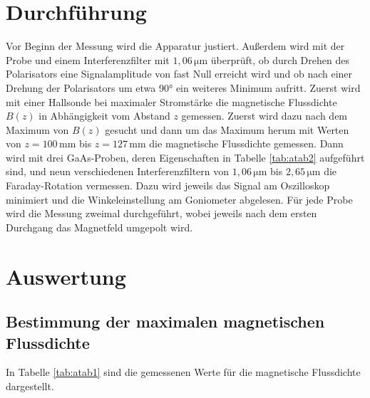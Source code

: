 \section{Durchführung}
Vor Beginn der Messung wird die Apparatur justiert. Außerdem wird mit der Probe und einem Interferenzfilter mit 
$1,06\, \si{\micro \meter}$ überprüft, ob durch Drehen des Polarisators eine Signalamplitude von fast Null erreicht wird 
und ob nach einer Drehung der Polarisators um etwa 90° ein weiteres Minimum aufritt.
Zuerst wird mit einer Hallsonde bei maximaler Stromstärke die magnetische Flussdichte $B(z)$ in Abhängigkeit vom 
Abstand $z$ gemessen. Zuerst wird dazu nach dem Maximum von $B(z)$ gesucht und dann um das Maximum herum mit Werten 
von $z = 100\, \si{\milli\meter}$ bis $z = 127\, \si{\milli\meter}$ die magnetische Flussdichte gemessen.
Dann wird mit drei GaAs-Proben, deren Eigenschaften in Tabelle \ref{tab:atab2} aufgeführt sind, und neun verschiedenen 
Interferenzfiltern von $1,06\, \si{\micro \meter}$ bis $2,65\, \si{\micro \meter}$ die Faraday-Rotation vermessen.
Dazu wird jeweils das Signal am Oszilloskop minimiert und die Winkeleinstellung am Goniometer abgelesen. Für jede Probe 
wird die Messung zweimal durchgeführt, wobei jeweils nach dem ersten Durchgang das Magnetfeld umgepolt wird.

\section{Auswertung}
\subsection{Bestimmung der maximalen magnetischen Flussdichte}
In Tabelle \ref{tab:atab1} sind die gemessenen Werte für die magnetische Flussdichte dargestellt. 

